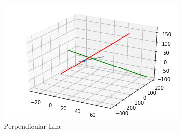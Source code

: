 \documentclass[journal,12pt,twocolumn]{IEEEtran}
\begin{document}
\begin{figure}[h]
    \centering
    \includegraphics[width = \columnwidth]{assignment1.png}
    \caption{Perpendicular Line }
    \label{fig:1}
\end{figure}
\end{document}
